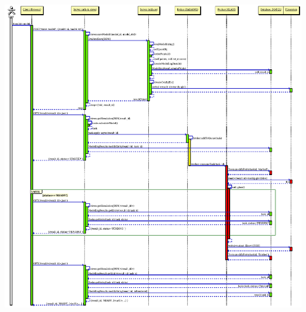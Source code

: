 \documentclass[aspectratio=1610]{beamer}
\begin{document}
\begin{frame}
  \includegraphics[height=\textheight]{../techdoc/seq/simulate}
\end{frame}
\end{document}
